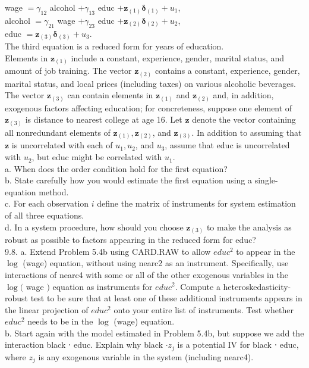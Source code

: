 \documentclass[10pt]{article}
\begin{document}
wage $=\gamma_{12}$ alcohol $+\gamma_{13}$ educ $+\mathbf{z}_{(1)} \boldsymbol{\delta}_{(1)}+u_{1}$,\\
alcohol $=\gamma_{21}$ wage $+\gamma_{23}$ educ $+\mathbf{z}_{(2)} \boldsymbol{\delta}_{(2)}+u_{2}$,\\
educ $=\mathbf{z}_{(3)} \boldsymbol{\delta}_{(3)}+u_{3}$.\\
The third equation is a reduced form for years of education.\\
Elements in $\mathbf{z}_{(1)}$ include a constant, experience, gender, marital status, and amount of job training. The vector $\mathbf{z}_{(2)}$ contains a constant, experience, gender, marital status, and local prices (including taxes) on various alcoholic beverages. The vector $\mathbf{z}_{(3)}$ can contain elements in $\mathbf{z}_{(1)}$ and $\mathbf{z}_{(2)}$ and, in addition, exogenous factors affecting education; for concreteness, suppose one element of $\mathbf{z}_{(3)}$ is distance to nearest college at age 16. Let $\mathbf{z}$ denote the vector containing all nonredundant elements of $\mathbf{z}_{(1)}, \mathbf{z}_{(2)}$, and $\mathbf{z}_{(3)}$. In addition to assuming that $\mathbf{z}$ is uncorrelated with each of $u_{1}, u_{2}$, and $u_{3}$, assume that educ is uncorrelated with $u_{2}$, but educ might be correlated with $u_{1}$.\\
a. When does the order condition hold for the first equation?\\
b. State carefully how you would estimate the first equation using a single-equation method.\\
c. For each observation $i$ define the matrix of instruments for system estimation of all three equations.\\
d. In a system procedure, how should you choose $\mathbf{z}_{(3)}$ to make the analysis as robust as possible to factors appearing in the reduced form for educ?\\
9.8. a. Extend Problem 5.4b using CARD.RAW to allow $e d u c^{2}$ to appear in the $\log$ (wage) equation, without using nearc2 as an instrument. Specifically, use interactions of nearc4 with some or all of the other exogenous variables in the $\log ($ wage $)$ equation as instruments for $e d u c^{2}$. Compute a heteroskedasticity-robust test to be sure that at least one of these additional instruments appears in the linear projection of $e d u c^{2}$ onto your entire list of instruments. Test whether $e d u c^{2}$ needs to be in the $\log$ (wage) equation.\\
b. Start again with the model estimated in Problem 5.4b, but suppose we add the interaction black ⋅ educ. Explain why black $\cdot z_{j}$ is a potential IV for black ⋅ educ, where $z_{j}$ is any exogenous variable in the system (including nearc4).\\
\end{document}
